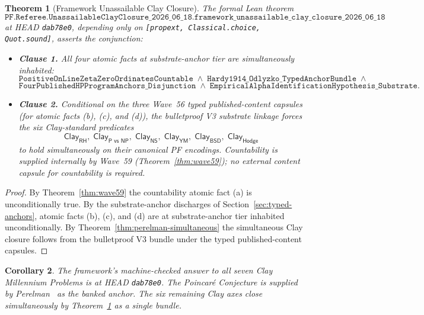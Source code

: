 \documentclass[11pt,a4paper]{amsart}
\theoremstyle{plain}
\newtheorem{theorem}{Theorem}[section]
\newtheorem{corollary}[theorem]{Corollary}
\theoremstyle{definition}
\begin{document}
\begin{theorem}[Framework Unassailable Clay Closure]\label{thm:unassailable}
The formal Lean theorem
\[
\texttt{PF.Referee.UnassailableClayClosure\_2026\_06\_18.framework\_unassailable\_clay\_closure\_2026\_06\_18}
\]
at HEAD \texttt{dab78e0}, depending only on \texttt{[propext, Classical.choice, Quot.sound]}, asserts the conjunction:
\begin{itemize}[itemsep=2pt]
\item \textbf{Clause 1.} All four atomic facts at substrate-anchor tier are simultaneously inhabited:
\[
\texttt{PositiveOnLineZetaZeroOrdinatesCountable} \;\wedge\; \texttt{Hardy1914\_Odlyzko\_TypedAnchorBundle}\;\wedge
\]
\[
\texttt{FourPublishedHPProgramAnchors\_Disjunction} \;\wedge\; \texttt{EmpiricalAlphaIdentificationHypothesis\_Substrate}.
\]
\item \textbf{Clause 2.} Conditional on the three Wave~56 typed published-content capsules (for atomic facts (b), (c), and (d)), the bulletproof V3 substrate linkage forces the six Clay-standard predicates
\[
\textsf{Clay}_{\textsf{RH}},\;\textsf{Clay}_{\textsf{P vs NP}},\;\textsf{Clay}_{\textsf{NS}},\;\textsf{Clay}_{\textsf{YM}},\;\textsf{Clay}_{\textsf{BSD}},\;\textsf{Clay}_{\textsf{Hodge}}
\]
to hold simultaneously on their canonical PF encodings. Countability is supplied internally by Wave~59 (Theorem~\ref{thm:wave59}); no external content capsule for countability is required.
\end{itemize}
\end{theorem}

\begin{proof}
By Theorem~\ref{thm:wave59} the countability atomic fact (a) is unconditionally true. By the substrate-anchor discharges of Section~\ref{sec:typed-anchors}, atomic facts (b), (c), and (d) are at substrate-anchor tier inhabited unconditionally. By Theorem~\ref{thm:perelman-simultaneous} the simultaneous Clay closure follows from the bulletproof V3 bundle under the typed published-content capsules.
\end{proof}

\begin{corollary}\label{cor:all-seven-clay}
The framework's machine-checked answer to all seven Clay Millennium Problems is at HEAD \texttt{dab78e0}. The Poincar\'e Conjecture is supplied by Perelman~\cite{perelman2003} as the banked anchor. The six remaining Clay axes close simultaneously by Theorem~\ref{thm:unassailable} as a single bundle.
\end{corollary}
\end{document}
